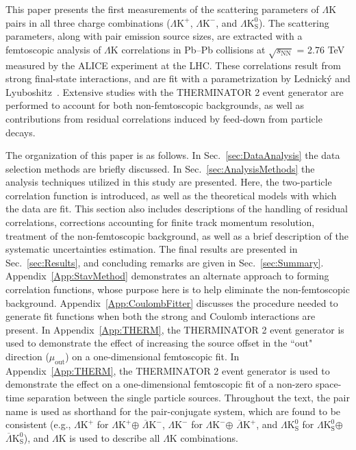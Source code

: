 \documentclass[ALICE,manyauthors]{cernphprep}
\newcommand{\LamK}{$\Lambda$K\xspace}
\newcommand{\LamKchP}{$\Lambda\mathrm{K^{+}}$\xspace}
\newcommand{\ALamKchM}{$\overline{\Lambda}\mathrm{K^{-}}$\xspace}
\newcommand{\LamKchM}{$\Lambda\mathrm{K^{-}}$\xspace}
\newcommand{\ALamKchP}{$\overline{\Lambda}\mathrm{K^{+}}$\xspace}
\newcommand{\LamKs}{$\Lambda\mathrm{K^{0}_{S}}$\xspace}
\newcommand{\ALamKs}{$\overline{\Lambda}\mathrm{K^{0}_{S}}$\xspace}
\begin{document}
This paper presents the first measurements of the scattering parameters of \LamK pairs in all three charge combinations (\LamKchP, \LamKchM, and \LamKs).
The scattering parameters, along with pair emission source sizes, are extracted with a femtoscopic analysis of \LamK correlations in Pb--Pb collisions at $\sqrt{s_{\mathrm{NN}}}$ = 2.76 TeV measured by the ALICE experiment at the LHC.  
These correlations result from strong final-state interactions, and are fit with a parametrization by Lednick\'y and Lyuboshitz~\cite{Lednicky:82}.  
Extensive studies with the THERMINATOR 2 event generator are performed to account for both non-femtoscopic backgrounds{\color{red},} as well as contributions from residual correlations induced by feed-down from particle decays.

The organization of this paper is as follows.  
In Sec.~\ref{sec:DataAnalysis} the data selection methods are briefly discussed.
In Sec.~\ref{sec:AnalysisMethods} the analysis techniques utilized in this study are presented.  
Here, the two-particle correlation function is introduced, as well as the theoretical models with which the data are fit.  
This section also includes descriptions of the handling of residual correlations, corrections accounting for finite track momentum resolution, treatment of the non-femtoscopic background, as well as a brief description of the systematic uncertainties estimation.  
The final results are presented in Sec.~\ref{sec:Results}{\color{red},} and concluding remarks are given in Sec.~\ref{sec:Summary}.
Appendix~\ref{App:StavMethod} demonstrates an alternate approach to forming correlation functions, whose purpose here is to help eliminate the non-femtoscopic background.
Appendix~\ref{App:CoulombFitter} discusses the procedure needed to generate fit functions when both the strong and Coulomb interactions are present.
{\color{red}In Appendix~\ref{App:THERM}, the THERMINATOR 2 event generator is used to demonstrate the effect of increasing the source offset in the ``out" direction ($\mu_{\mathrm{out}}$) on a one-dimensional femtoscopic fit.}
{\color{blue}In Appendix~\ref{App:THERM}, the THERMINATOR 2 event generator is used to demonstrate the effect on a one-dimensional femtoscopic fit of a non-zero space-time separation between the single particle sources.}
Throughout the text, the pair name is used as shorthand for the pair-conjugate system, which are found to be consistent (e.g., \LamKchP for \LamKchP $\oplus$ \ALamKchM, \LamKchM for \LamKchM $\oplus$ \ALamKchP, and \LamKs for \LamKs $\oplus$ \ALamKs), and \LamK is used to describe all \LamK combinations.
\end{document}
